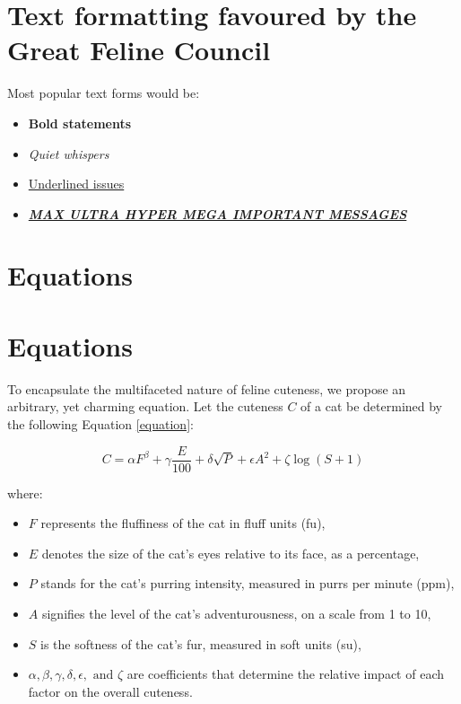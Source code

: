 \documentclass{article}
\begin{document}
    \section{Text formatting favoured by the Great Feline Council}
    
        Most popular text forms would be:
        \begin{itemize}
            \item \textbf{Bold statements}
            \item \textit{Quiet whispers}
            \item \underline{Underlined issues}
            \item \underline{\textit{\textbf{MAX ULTRA HYPER MEGA IMPORTANT MESSAGES}}}
        \end{itemize}

    \section{Equations}

    \section{Equations}

        To encapsulate the multifaceted nature of feline cuteness, we propose an arbitrary, yet charming equation. Let the cuteness \(C\) of a cat be determined by the following Equation \ref{equation}:
        
        \begin{equation}
            \label{equation}
            C = \alpha F^\beta + \gamma \frac{E}{100} + \delta \sqrt{P} + \epsilon A^2 + \zeta \log(S + 1)
        \end{equation}
        
        where:
        
        \begin{itemize}
            \item \(F\) represents the fluffiness of the cat in fluff units (fu),
            \item \(E\) denotes the size of the cat's eyes relative to its face, as a percentage,
            \item \(P\) stands for the cat's purring intensity, measured in purrs per minute (ppm),
            \item \(A\) signifies the level of the cat's adventurousness, on a scale from 1 to 10,
            \item \(S\) is the softness of the cat's fur, measured in soft units (su),
            \item \(\alpha, \beta, \gamma, \delta, \epsilon, \text{ and } \zeta\) are coefficients that determine the relative impact of each factor on the overall cuteness.
        \end{itemize}
        
\end{document}
